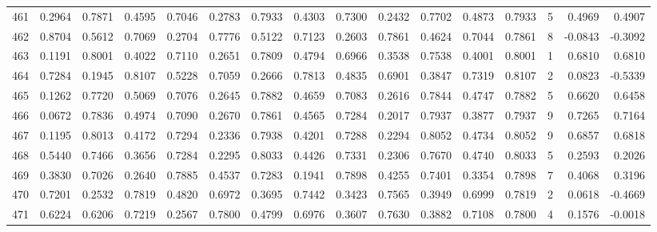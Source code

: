 \begin{tabular}{lrrrrrrrrrrrrrrr}
461 &      0.2964 &  0.7871 &  0.4595 &  0.7046 &  0.2783 &  0.7933 &  0.4303 &  0.7300 &  0.2432 &  0.7702 &   0.4873 &     0.7933 &      5 &                    0.4969 &                     0.4907 \\
462 &      0.8704 &  0.5612 &  0.7069 &  0.2704 &  0.7776 &  0.5122 &  0.7123 &  0.2603 &  0.7861 &  0.4624 &   0.7044 &     0.7861 &      8 &                   -0.0843 &                    -0.3092 \\
463 &      0.1191 &  0.8001 &  0.4022 &  0.7110 &  0.2651 &  0.7809 &  0.4794 &  0.6966 &  0.3538 &  0.7538 &   0.4001 &     0.8001 &      1 &                    0.6810 &                     0.6810 \\
464 &      0.7284 &  0.1945 &  0.8107 &  0.5228 &  0.7059 &  0.2666 &  0.7813 &  0.4835 &  0.6901 &  0.3847 &   0.7319 &     0.8107 &      2 &                    0.0823 &                    -0.5339 \\
465 &      0.1262 &  0.7720 &  0.5069 &  0.7076 &  0.2645 &  0.7882 &  0.4659 &  0.7083 &  0.2616 &  0.7844 &   0.4747 &     0.7882 &      5 &                    0.6620 &                     0.6458 \\
466 &      0.0672 &  0.7836 &  0.4974 &  0.7090 &  0.2670 &  0.7861 &  0.4565 &  0.7284 &  0.2017 &  0.7937 &   0.3877 &     0.7937 &      9 &                    0.7265 &                     0.7164 \\
467 &      0.1195 &  0.8013 &  0.4172 &  0.7294 &  0.2336 &  0.7938 &  0.4201 &  0.7288 &  0.2294 &  0.8052 &   0.4734 &     0.8052 &      9 &                    0.6857 &                     0.6818 \\
468 &      0.5440 &  0.7466 &  0.3656 &  0.7284 &  0.2295 &  0.8033 &  0.4426 &  0.7331 &  0.2306 &  0.7670 &   0.4740 &     0.8033 &      5 &                    0.2593 &                     0.2026 \\
469 &      0.3830 &  0.7026 &  0.2640 &  0.7885 &  0.4537 &  0.7283 &  0.1941 &  0.7898 &  0.4255 &  0.7401 &   0.3354 &     0.7898 &      7 &                    0.4068 &                     0.3196 \\
470 &      0.7201 &  0.2532 &  0.7819 &  0.4820 &  0.6972 &  0.3695 &  0.7442 &  0.3423 &  0.7565 &  0.3949 &   0.6999 &     0.7819 &      2 &                    0.0618 &                    -0.4669 \\
471 &      0.6224 &  0.6206 &  0.7219 &  0.2567 &  0.7800 &  0.4799 &  0.6976 &  0.3607 &  0.7630 &  0.3882 &   0.7108 &     0.7800 &      4 &                    0.1576 &                    -0.0018 \\

\end{tabular}
